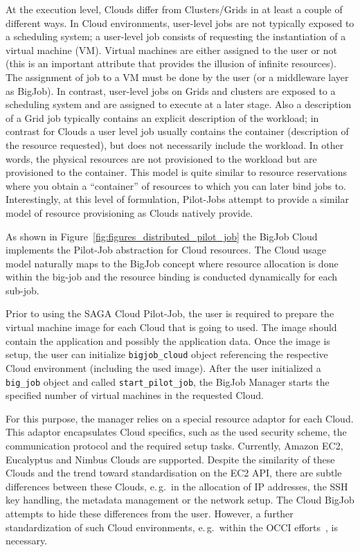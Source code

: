 \documentclass[conference,final]{IEEEtran}
\begin{document}
At the execution level, Clouds differ from Clusters/Grids in at least
a couple of different ways. In Cloud environments, user-level jobs are
not typically exposed to a scheduling system; a user-level job
consists of requesting the instantiation of a virtual machine (VM).
Virtual machines are either assigned to the user or not (this is an
important attribute that provides the illusion of infinite resources).
The assignment of job to a VM must be done by the user (or a
middleware layer as BigJob).  In contrast, user-level jobs on Grids
and clusters are exposed to a scheduling system and are assigned to
execute at a later stage.  Also a description of a Grid job
typically contains an explicit description of the workload; in contrast
for Clouds a user level job usually contains the container
(description of the resource requested), but does not necessarily
include the workload. In other words, the physical resources are not
provisioned to the workload but are provisioned to the container.
This model is quite similar to resource reservations where you obtain
a ``container'' of resources to which you can later bind jobs
to. Interestingly, at this level of formulation, Pilot-Jobs attempt to
provide a similar model of resource provisioning as Clouds natively
provide.


As shown in Figure~\ref{fig:figures_distributed_pilot_job} the BigJob Cloud implements
the Pilot-Job abstraction for Cloud resources. The Cloud usage model naturally maps
to the BigJob concept where resource allocation is done within the big-job and the 
resource binding is conducted dynamically for each sub-job.

Prior to using the SAGA Cloud Pilot-Job, the user is required to
prepare the virtual machine image for each Cloud that is going to
used. The image should contain the application and possibly the
application data. Once the image is setup, the user can initialize
\texttt{bigjob\_cloud} object referencing the respective Cloud
environment (including the used image). After the user initialized 
a \texttt{big\_job} object and called \texttt{start\_pilot\_job},
the BigJob Manager starts the specified number of virtual machines 
in the requested Cloud. 



For this purpose, the manager relies on a special resource adaptor
for each Cloud. This adaptor encapsulates Cloud specifics, such as the used
security scheme, the communication protocol and the required setup tasks. Currently,
Amazon EC2, Eucalyptus and Nimbus Clouds are supported. Despite the similarity 
of these Clouds and the trend toward standardisation on the
EC2 API, there are subtle differences between these Clouds, e.\,g.\ in the allocation
of IP addresses, the SSH key handling, the metadata management or 
the network setup. The Cloud BigJob attempts to hide these differences 
from the user. However, a further standardization of such Cloud environments, 
e.\,g.\ within the OCCI efforts~\cite{occi}, is necessary.
\end{document}
